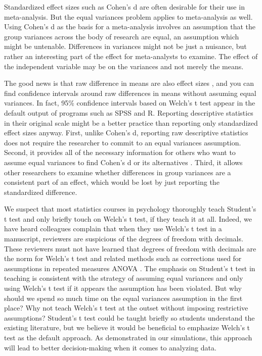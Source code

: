 \documentclass[man, noextraspace, apacite, floatsintext]{apa6}
\begin{document}
    Standardized effect sizes such as Cohen's d are often desirable for their 
use in meta-analysis. But the equal variances 
problem applies to meta-analysis as well. Using Cohen's d as the basis for a 
meta-analysis involves an assumption that the group variances across 
the body of research are equal, an assumption which might be untenable. Differences in variances might not be just a nuisance, but rather an interesting part of the effect for meta-analysts to examine. The effect of the independent variable may be on the variances and not merely the means.
    
    The good news is that raw difference in means are also effect sizes
\cite{Cumming2014, Gonzalez2008, Kelley2012}, and you can find confidence intervals around raw differences 
in means without assuming equal variances. In fact, 95\% confidence intervals
based on Welch's t test appear in the 
default output of programs such as SPSS and R. Reporting 
descriptive statistics in their original scale might be a better practice than 
reporting only standardized effect sizes anyway. First, unlike Cohen's d, reporting raw descriptive statistics does not require the researcher to commit to an 
equal variances assumption. Second, it provides all of the necessary 
information for others who want to assume equal variances to find Cohen's d or its alternatives \cite{Peng2013, 
Grissom2001}. Third, it allows other researchers to examine whether differences 
in group variances are a consistent part of an effect, which would be lost by 
just reporting the standardized difference.

    We suspect that most statistics courses in psychology thoroughly teach Student's t 
test and only briefly touch on Welch's t test, if they teach it at 
all. Indeed, we have heard colleagues complain that when they use Welch's t test in a 
manuscript, reviewers are suspicious of the 
degrees of freedom with decimals. These reviewers must not have learned that 
degrees of freedom with decimals are the norm for Welch's t test and related methods such as corrections used for assumptions in repeated measures ANOVA \cite{Gonzalez2008}. The emphasis 
on Student's t test in teaching is consistent with the strategy of assuming equal variances and only using Welch's t test if it appears the assumption has been violated. But why should we spend so much 
time on the equal variances assumption in the first place? Why not teach 
Welch's t test at the outset without imposing 
restrictive assumptions? Student's t test could be taught briefly so  
students understand the existing literature, but we believe it would be 
beneficial to emphasize Welch's t test as the default approach. As demonstrated 
in our simulations, this approach will lead to better decision-making when 
it comes to analyzing data. 
\end{document}
